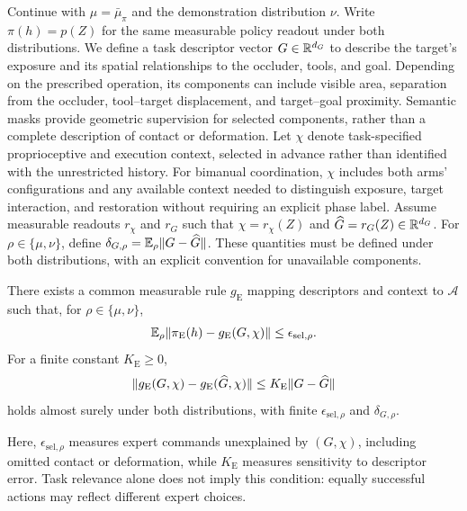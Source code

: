 Continue with $\mu=\bar\mu_\pi$ and the demonstration distribution $\nu$.
Write $\pi(h)=p(Z)$ for the same measurable policy readout under both distributions.
We define a task descriptor vector $G\in\mathbb R^{d_G}$ to describe the target's exposure and its spatial relationships to the occluder, tools, and goal.
Depending on the prescribed operation, its components can include visible area, separation from the occluder, tool--target displacement, and target--goal proximity.
Semantic masks provide geometric supervision for selected components, rather than a complete description of contact or deformation.
Let $\chi$ denote task-specified proprioceptive and execution context, selected in advance rather than identified with the unrestricted history.
For bimanual coordination, $\chi$ includes both arms' configurations and any available context needed to distinguish exposure, target interaction, and restoration without requiring an explicit phase label.
Assume measurable readouts $r_\chi$ and $r_G$ such that $\chi=r_\chi(Z)$ and $\widehat G=r_G(Z)\in\mathbb R^{d_G}$.
For $\rho\in\{\mu,\nu\}$, define $\delta_{G,\rho}=\mathbb E_\rho\lVert G-\widehat G\rVert$.
These quantities must be defined under both distributions, with an explicit convention for unavailable components.

\begin{assumption}
\label{ass:expertselection}
There exists a common measurable rule $g_{\mathrm E}$ mapping descriptors and context to $\mathcal A$ such that, for $\rho\in\{\mu,\nu\}$,
\begin{equation}
 \mathbb E_\rho\lVert\pi_{\mathrm E}(h)-g_{\mathrm E}(G,\chi)\rVert
 \le\epsilon_{\mathrm{sel},\rho}.
 \label{eq:expertselectionapprox}
\end{equation}
For a finite constant $K_{\mathrm E}\ge0$,
\begin{equation}
 \lVert g_{\mathrm E}(G,\chi)-g_{\mathrm E}(\widehat G,\chi)\rVert
 \le K_{\mathrm E}\lVert G-\widehat G\rVert
 \label{eq:expertselectionsensitivity}
\end{equation}
holds almost surely under both distributions, with finite $\epsilon_{\mathrm{sel},\rho}$ and $\delta_{G,\rho}$.
\end{assumption}
Here, $\epsilon_{\mathrm{sel},\rho}$ measures expert commands unexplained by $(G,\chi)$, including omitted contact or deformation, while $K_{\mathrm E}$ measures sensitivity to descriptor error.
Task relevance alone does not imply this condition: equally successful actions may reflect different expert choices.

